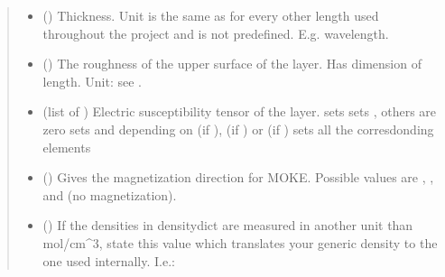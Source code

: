 \documentclass[letterpaper,10pt,english]{sphinxmanual}
\begin{document}
\begin{fulllineitems}
\begin{fulllineitems}
\begin{quote}
\begin{description}
\begin{itemize}
\item {} 
 ({\hyperref[\detokenize{modules-api/parameters:Parameters.Parameter}]{}}) \textendash{} Thickness. Unit is the same as for every other length used throughout the project and is not predefined. E.g. wavelength.

\item {} 
 ({\hyperref[\detokenize{modules-api/parameters:Parameters.Parameter}]{}}) \textendash{} The roughness of the upper surface of the layer. Has dimension of length. Unit: see .

\item {} 
 (list of {\hyperref[\detokenize{modules-api/parameters:Parameters.Parameter}]{}}) \textendash{} Electric susceptibility tensor of the layer.
\textbar{} \sphinxstyleemphasis{{[}chi{]}} sets 
\textbar{}  sets , others are zero
\textbar{}  sets   and depending on   (if ),  (if ) or  (if )
\textbar{}  sets all the corresdonding elements

\item {} 
 () \textendash{} Gives the magnetization direction for MOKE. Possible values are , ,  and  (no magnetization).

\item {} 
 () \textendash{} 
If the densities in densitydict are measured in another unit than mol/cm\textasciicircum{}3, state this value which translates your generic density to the one used internally.
I.e.:


\end{itemize}
\end{description}
\end{quote}
\end{fulllineitems}
\end{fulllineitems}
\end{document}
